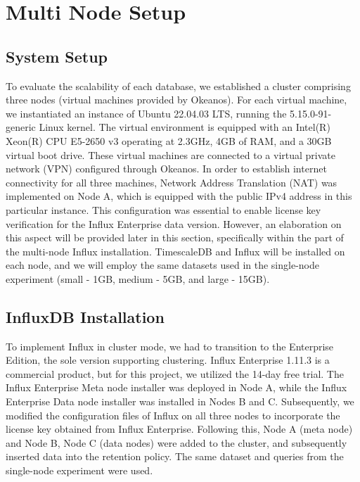 \documentclass[conference]{IEEEtran}
\begin{document}
\section{Multi Node Setup}


\subsection{System Setup}
To evaluate the scalability of each database, we established a cluster comprising three nodes (virtual machines provided by Okeanos). For each virtual machine, we instantiated an instance of Ubuntu 22.04.03 LTS, running the 5.15.0-91-generic Linux kernel. The virtual environment is equipped with an Intel(R) Xeon(R) CPU E5-2650 v3 operating at 2.3GHz, 4GB of RAM, and a 30GB virtual boot drive. These virtual machines are connected to a virtual private network (VPN) configured through Okeanos. In order to establish internet connectivity for all three machines, Network Address Translation (NAT) was implemented on Node A, which is equipped with the public IPv4 address in this particular instance. This configuration was essential to enable license key verification for the Influx Enterprise data version. However, an elaboration on this aspect will be provided later in this section, specifically within the part of the multi-node Influx installation. TimescaleDB and Influx will be installed on each node, and we will employ the same datasets used in the single-node experiment (small - 1GB, medium - 5GB, and large - 15GB).


\subsection{InfluxDB Installation}
To implement Influx in cluster mode, we had to transition to the Enterprise Edition, the sole version supporting clustering. Influx Enterprise 1.11.3 is a commercial product, but for this project, we utilized the 14-day free trial. The Influx Enterprise Meta node installer was deployed in Node A, while the Influx Enterprise Data node installer was installed in Nodes B and C. Subsequently, we modified the configuration files of Influx on all three nodes to incorporate the license key obtained from Influx Enterprise. Following this, Node A (meta node) and Node B, Node C (data nodes) were added to the cluster, and subsequently inserted data into the retention policy. The same dataset and queries from the single-node experiment were used.
\end{document}
